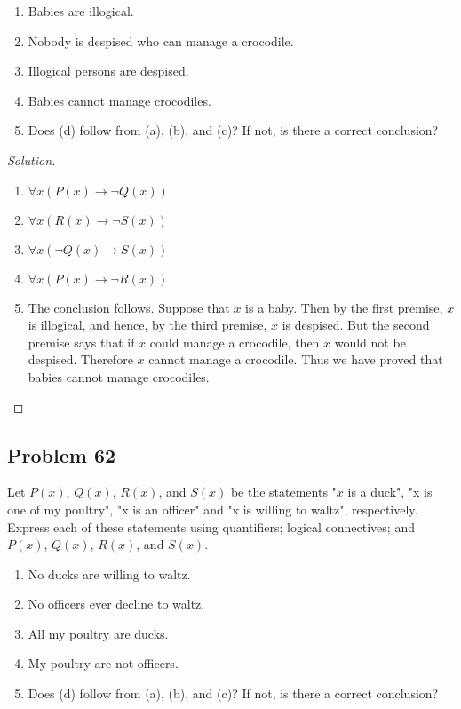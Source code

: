 \documentclass{article}
\newenvironment{solution}{\renewcommand\qedsymbol{}\begin{proof}[Solution]}{\end{proof}}
\begin{document}
\begin{enumerate}[leftmargin=16pt, topsep = 8pt]
\item Babies are illogical.
\item Nobody is despised who can manage a crocodile.
\item Illogical persons are despised.
\item Babies cannot manage crocodiles.
\item Does (d) follow from (a), (b), and (c)? If not, is there a correct conclusion?
\end{enumerate}

\begin{solution}
\hspace{1pt}

\begin{enumerate}[leftmargin=16pt, topsep = 8pt]
\item $\forall x(P(x) \rightarrow \neg Q(x))$
\item $\forall x(R(x) \rightarrow \neg S(x))$
\item $\forall x(\neg Q(x) \rightarrow S(x))$
\item $\forall x(P(x) \rightarrow \neg R(x))$
\item The conclusion follows. Suppose that $x$ is a baby. Then by the first premise, $x$ is illogical, and hence, by the third premise, $x$ is despised. But the second premise says that if $x$ could manage a crocodile, then $x$ would not be despised. Therefore $x$ cannot manage a crocodile. Thus we have proved that babies cannot manage crocodiles. 
\end{enumerate}
\end{solution}

\clearpage
\subsection*{Problem 62}
Let $P(x)$, $Q(x)$, $R(x)$, and $S(x)$ be the statements "$x$ is a duck", "x is one of my poultry", "x is an officer" and "x is willing to waltz", respectively. Express each of these statements using quantifiers; logical connectives; and $P(x)$, $Q(x)$, $R(x)$, and $S(x)$.

\begin{enumerate}[leftmargin=16pt, topsep = 8pt]
\item No ducks are willing to waltz.
\item No officers ever decline to waltz.
\item All my poultry are ducks.
\item My poultry are not officers.
\item Does (d) follow from (a), (b), and (c)? If not, is there a correct conclusion?
\end{enumerate}
\end{document}
